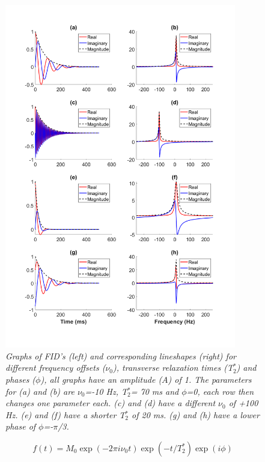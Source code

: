 \documentclass[class=article, crop=false]{standalone}
\begin{document}
\begin{figure}
    \centering
    \includegraphics[width=0.9\textwidth]{Figures/Theory/FID_Lorentz.png}
    \caption{\textit{Graphs of FID's (left) and corresponding lineshapes (right) for different frequency offsets ($\nu_0$), transverse relaxation times (T$_2^*$) and phases ($\phi$), all graphs have an amplitude ($A$) of 1. The parameters for (a) and (b) are $\nu_0$=-10 Hz, T$_2^*$= 70 ms and $\phi$=0, each row then changes one parameter each. (c) and (d) have a different $\nu_0$ of +100 Hz. (e) and (f) have a shorter T$_2^*$ of 20 ms. (g) and (h) have a lower phase of $\phi$=-$\pi$/3.}}
    \label{fig:theory:FID_Lorentz}
\end{figure}

\begin{equation}
    f(t) = M_0\exp(-2\pi i \nu_0t)\exp(-t/T_2^*)\exp(i\phi)
    \label{eqn:theory:euler}
\end{equation}
\end{document}
